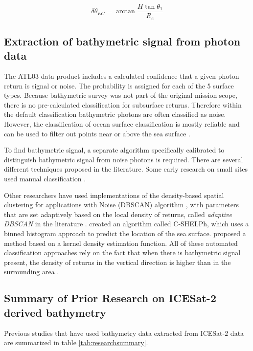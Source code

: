 \begin{equation}
      \delta \theta_{EC} = \arctan{\frac{H \tan{\theta_1}}{R_e}}
\end{equation}


\subsection{Extraction of bathymetric signal from photon data}\label{subsec:signal-finding}
The ATL03 data product includes a calculated confidence that a given photon return is signal or noise. The probability is assigned for each of the 5 surface types. Because bathymetric survey was not part of the original mission scope, there is no pre-calculated classification for subsurface returns. Therefore within the default classification bathymetric photons are often classified as noise. However, the classification of ocean surface classification is mostly reliable and can be used to filter out points near or above the sea surface \parencite{Ranndal2021}.

To find bathymetric signal, a separate algorithm specifically calibrated to distinguish bathymetric signal from noise photons is required. There are several different techniques proposed in the literature. Some early research on small sites used manual classification \parencite{Forfinski-Sarkozi2016,Thomas2021d,Babbel2021a,Albright2021}.

Other researchers have used implementations of the density-based spatial clustering for applications with Noise (DBSCAN) algorithm \parencite{Ester1996}, with parameters that are set adaptively based on the local density of returns, called \emph{adaptive DBSCAN} in the literature \parencite{Ma2020,Xie2021,LeQuilleuc2022b,Liu2021}.  \citeauthor{Thomas2022} created an algorithm called C-SHELPh, which uses a binned histogram approach to predict the location of the sea surface. \cite{Datta2021} proposed a method based on a kernel density estimation function. All of these automated classification approaches rely on the fact that when there is bathymetric signal present, the density of returns in the vertical direction is higher than in the surrounding area \parencite{Neuenschwander2019}.


\subsection{Summary of Prior Research on ICESat-2 derived bathymetry} %

Previous studies that have used bathymetry data extracted from ICESat-2 data are summarized in table \ref{tab:researchsummary}.

